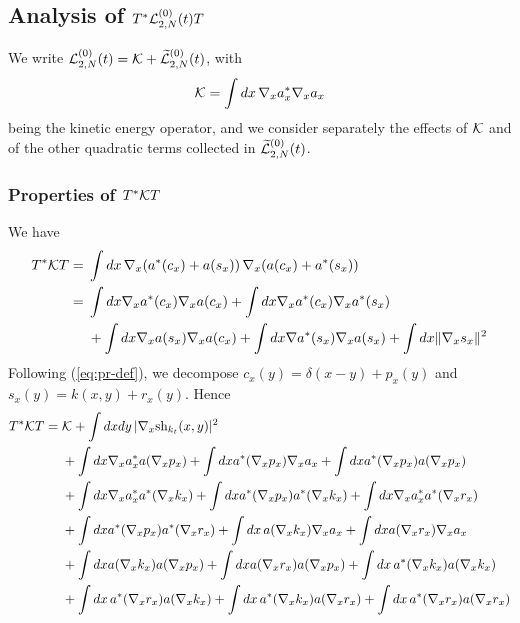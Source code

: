 \documentclass[11pt,a4paper,DIV11]{scrartcl}	%
\newcommand{\wt}{\widetilde}
\newcommand{\cK}{{\cal K}}
\newcommand{\cL}{{\cal L}}
\begin{document}
\subsection{Analysis of $T^* \cL_{2,N}^{(0)} (t) T$}

We write $\cL_{2,N}^{(0)} (t) = \cK + \wt{\cL}_{2,N}^{(0)} (t)$, with \[ \cK = \int dx \, \nabla_x a^*_x \nabla_x a_x \] being the kinetic energy operator, and we consider separately the effects of $\cK$ 
and of the other quadratic terms collected in $\wt{\cL}_{2,N}^{(0)} (t)$. 

\subsubsection{Properties of $T^* \cK T$}

We have
\[ \begin{split} T^* \cK T = \; & \int dx \, \nabla_x (a^* (c_x) + a(s_x)) \, \nabla_x (a(c_x) + a^* (s_x)) \\
= \; & \int dx \nabla_x a^* (c_x) \nabla_x a(c_x) + \int dx \nabla_x a^* (c_x) \nabla_x a^* (s_x) \\ & + \int dx \nabla_x a(s_x) \nabla_x a(c_x) + \int dx \nabla a^* (s_x) \nabla_x a (s_x) + \int dx  \| \nabla_x s_x \|^2
\end{split} \]
Following (\ref{eq:pr-def}), we decompose  $c_x (y) = \delta (x-y) + p_x (y)$ and $s_x (y) = k (x,y) + r_x (y)$. Hence
\begin{equation}\label{eq:TKT} 
\begin{split} 
T^* \cK T = \; & \cK + \int dx dy \, | \nabla_x \text{sh}_{k_t} (x,y)|^2 \\  & + \int dx \nabla_x a^*_x a (\nabla_x p_x) + \int dx a^* (\nabla_x p_x) \nabla_x a_x + \int dx a^* (\nabla_x p_x) a (\nabla_x p_x)  \\ &+ \int dx \nabla_x a_x^* a^* (\nabla_x k_x)  + \int dx a^* (\nabla_x p_x) a^* (\nabla_x k_x) +  \int dx \nabla_x a_x^* a^* (\nabla_x r_x)  \\ & + \int dx a^* (\nabla_x p_x) a^* (\nabla_x r_x) + \int dx \, a(\nabla_x k_x) \nabla_x a_x + \int dx a(\nabla_x r_x) \nabla_x a_x  \\ & + \int dx a(\nabla_x k_x) a (\nabla_x p_x) + \int dx a(\nabla_x r_x) a(\nabla_x p_x) + \int dx \, a^* (\nabla_x k_x) a (\nabla_x k_x)  \\ & + \int dx \, a^* (\nabla_x r_x) a (\nabla_x k_x) + \int dx \, a^* (\nabla_x k_x) a(\nabla_x r_x) + \int dx \, a^* (\nabla_x r_x) a(\nabla_x r_x) 
\end{split} 
\end{equation}
\end{document}
